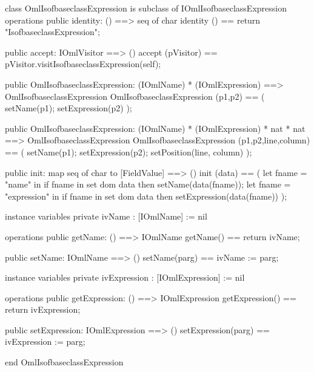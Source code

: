 \begin{vdm_al}
class OmlIsofbaseclassExpression is subclass of IOmlIsofbaseclassExpression
operations
  public identity: () ==> seq of char
  identity () == return "IsofbaseclassExpression";

  public accept: IOmlVisitor ==> ()
  accept (pVisitor) == pVisitor.visitIsofbaseclassExpression(self);

  public OmlIsofbaseclassExpression:
    (IOmlName) *
    (IOmlExpression) ==> OmlIsofbaseclassExpression
  OmlIsofbaseclassExpression (p1,p2) == 
    ( setName(p1);
      setExpression(p2) );

  public OmlIsofbaseclassExpression:
    (IOmlName) *
    (IOmlExpression) *
    nat *
    nat ==> OmlIsofbaseclassExpression
  OmlIsofbaseclassExpression (p1,p2,line,column) == 
    ( setName(p1);
      setExpression(p2);
      setPosition(line, column) );

  public init: map seq of char to [FieldValue] ==> ()
  init (data) ==
    ( let fname = "name" in
        if fname in set dom data
        then setName(data(fname));
      let fname = "expression" in
        if fname in set dom data
        then setExpression(data(fname)) );

instance variables
  private ivName : [IOmlName] := nil

operations
  public getName: () ==> IOmlName
  getName() == return ivName;

  public setName: IOmlName ==> ()
  setName(parg) == ivName := parg;

instance variables
  private ivExpression : [IOmlExpression] := nil

operations
  public getExpression: () ==> IOmlExpression
  getExpression() == return ivExpression;

  public setExpression: IOmlExpression ==> ()
  setExpression(parg) == ivExpression := parg;

end OmlIsofbaseclassExpression
\end{vdm_al}

